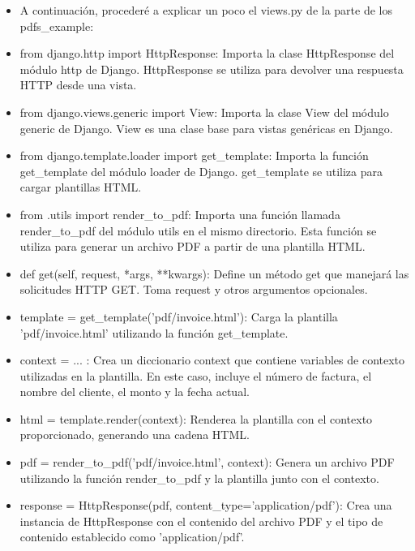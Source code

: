 
\begin{itemize}
        \item A continuación, procederé a explicar un poco el views.py de la parte de los pdfs_example:
        \item from django.http import HttpResponse: Importa la clase HttpResponse del módulo http de Django. HttpResponse se utiliza para devolver una respuesta HTTP desde una vista.
        \item from django.views.generic import View: Importa la clase View del módulo generic de Django. View es una clase base para vistas genéricas en Django.
        \item from django.template.loader import get_template: Importa la función get_template del módulo loader de Django. get_template se utiliza para cargar plantillas HTML.
        \item from .utils import render_to_pdf: Importa una función llamada render_to_pdf del módulo utils en el mismo directorio. Esta función se utiliza para generar un archivo PDF a partir de una plantilla HTML.
        \item def get(self, request, *args, **kwargs): Define un método get que manejará las solicitudes HTTP GET. Toma request y otros argumentos opcionales.
        \item template = get_template('pdf/invoice.html'): Carga la plantilla 'pdf/invoice.html' utilizando la función get_template.
        \item context = { ... }: Crea un diccionario context que contiene variables de contexto utilizadas en la plantilla. En este caso, incluye el número de factura, el nombre del cliente, el monto y la fecha actual.
        \item html = template.render(context): Renderea la plantilla con el contexto proporcionado, generando una cadena HTML.
        \item pdf = render_to_pdf('pdf/invoice.html', context): Genera un archivo PDF utilizando la función render_to_pdf y la plantilla junto con el contexto.
        \item response = HttpResponse(pdf, content_type='application/pdf'): Crea una instancia de HttpResponse con el contenido del archivo PDF y el tipo de contenido establecido como 'application/pdf'.
\end{itemize}

